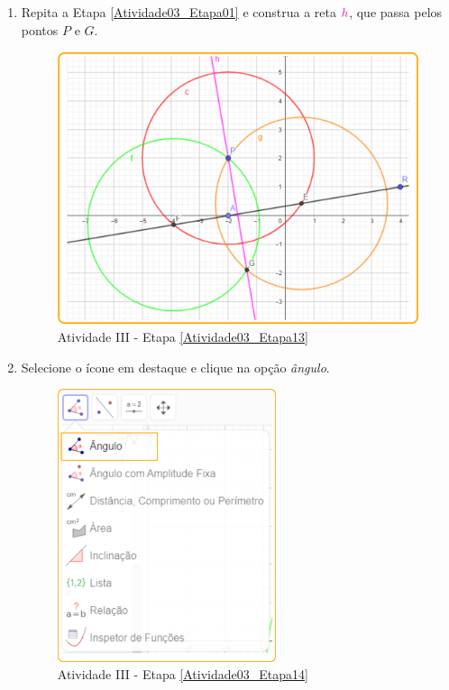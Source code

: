 \documentclass[11pt,a4paper]{article}
\begin{document}
\begin{enumerate}[{Etapa} 1.]
\item Repita a Etapa \ref{Atividade03_Etapa01} e construa a reta ${\color{magenta}{h}}$, que passa pelos pontos $P$ e $G$. \label{Atividade03_Etapa13}
\begin{figure}[H]
    \centering
    \includegraphics[height=8cm]{Figuras/T01_Atividade03_Fig05.png}
    \caption{Atividade III - Etapa \ref{Atividade03_Etapa13}}
    \label{Atividade03_Etapa13_Imagem}
\end{figure}

\item Selecione o ícone em destaque e clique na opção {\it ângulo}. \label{Atividade03_Etapa14}
\begin{figure}[H]
    \centering
    \includegraphics[height=8cm]{Figuras/T01_Elemento08.png}
    \caption{Atividade III - Etapa \ref{Atividade03_Etapa14}}
    \label{Atividade03_Etapa14_Imagem}
\end{figure}


\end{enumerate}
\end{document}
